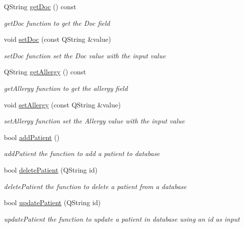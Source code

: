 \begin{DoxyCompactItemize}
Q\+String \mbox{\hyperlink{class_patient_a8b74db0ad3cc5ea785a31cedc7eb5a42}{get\+Doc}} () const
\begin{DoxyCompactList}\small\item\em get\+Doc function to get the Doc field \end{DoxyCompactList}\item 
void \mbox{\hyperlink{class_patient_a4682d8a78adadf1edf65dd12b0ca268c}{set\+Doc}} (const Q\+String \&value)
\begin{DoxyCompactList}\small\item\em set\+Doc function set the Doc value with the input value \end{DoxyCompactList}\item 
Q\+String \mbox{\hyperlink{class_patient_a5f451d3a87a379f8cef6fe844e0c3598}{get\+Allergy}} () const
\begin{DoxyCompactList}\small\item\em get\+Allergy function to get the allergy field \end{DoxyCompactList}\item 
void \mbox{\hyperlink{class_patient_a61743a052c51abe19ae75f5945fa98b1}{set\+Allergy}} (const Q\+String \&value)
\begin{DoxyCompactList}\small\item\em set\+Allergy function set the Allergy value with the input value \end{DoxyCompactList}\item 
bool \mbox{\hyperlink{class_patient_ae6aa7dee3e8d59eaaad1c289f295ee51}{add\+Patient}} ()
\begin{DoxyCompactList}\small\item\em add\+Patient the function to add a patient to database \end{DoxyCompactList}\item 
bool \mbox{\hyperlink{class_patient_a39280c0d0686de60cedd2fddc8dfb229}{delete\+Patient}} (Q\+String id)
\begin{DoxyCompactList}\small\item\em delete\+Patient the function to delete a patient from a database \end{DoxyCompactList}\item 
bool \mbox{\hyperlink{class_patient_a3ff3a7a688fbaa3d0b260eb0f08c8180}{update\+Patient}} (Q\+String id)
\begin{DoxyCompactList}\small\item\em update\+Patient the function to update a patient in database using an id as input \end{DoxyCompactList}\item 

\end{DoxyCompactItemize}
